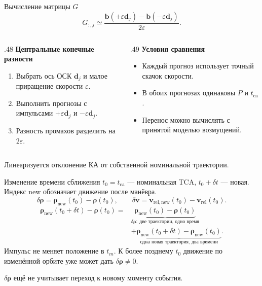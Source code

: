 \documentclass[11pt,aspectratio=169,t]{beamer}
\newcommand{\eqcompact}{\fontsize{10}{12}\selectfont}
\newcommand{\derivationmathspacing}{%
  \setlength{\abovedisplayskip}{2pt}%
  \setlength{\belowdisplayskip}{3pt}%
  \setlength{\abovedisplayshortskip}{2pt}%
  \setlength{\belowdisplayshortskip}{2pt}%
  \setlength{\jot}{2pt}}
\newcommand{\vect}[1]{\boldsymbol{#1}}
\begin{document}
\begin{frame}{Вычисление матрицы $G$}
\relax\derivationmathspacing
{\eqcompact\derivationmathspacing
\[
 \boxed{G_{:,j}\simeq
 \frac{\vect b(+\varepsilon\vect d_j)
       -\vect b(-\varepsilon\vect d_j)}{2\varepsilon}.}
\]
}
\begin{columns}[T,onlytextwidth]
\begin{column}{.48\textwidth}
\textbf{Центральные конечные разности}
\begin{enumerate}
\setlength{\itemsep}{3pt}
\item Выбрать ось ОСК $\vect d_j$ и малое приращение скорости $\varepsilon$.
\item Выполнить прогнозы с импульсами $+\varepsilon\vect d_j$ и $-\varepsilon\vect d_j$.
\item Разность промахов разделить на $2\varepsilon$.
\end{enumerate}
\end{column}
\begin{column}{.49\textwidth}
\textbf{Условия сравнения}
\begin{itemize}
\setlength{\itemsep}{3pt}
\item Каждый прогноз использует точный скачок скорости.
\item В обоих прогнозах одинаковы $P$ и $t_{\mathrm{ca}}$.
\item Перенос можно вычислять с принятой моделью возмущений.
\end{itemize}
\end{column}
\end{columns}
\smallskip
Линеаризуется отклонение КА от собственной номинальной траектории.
\end{frame}

\begin{frame}{Изменение времени сближения}
\relax\derivationmathspacing
$t_0=t_{\mathrm{ca}}$ --- номинальная TCA, $t_0+\delta t$ --- новая. Индекс $\mathrm{new}$ обозначает движение после манёвра.
{\eqcompact\derivationmathspacing
\[
 \delta\vect\rho=\vect\rho_{\mathrm{new}}(t_0)-\vect\rho(t_0),\qquad
 \delta\vect v=\vect v_{\mathrm{rel,new}}(t_0)-\vect v_{\mathrm{rel}}(t_0).
\]
\[
 \begin{aligned}
 \vect\rho_{\mathrm{new}}(t_0+\delta t)-\vect\rho(t_0)
 ={}&\underbrace{\vect\rho_{\mathrm{new}}(t_0)-\vect\rho(t_0)}
 _{\delta\vect\rho:\ \text{две траектории, одно время}}\\[4mm]
 &+\underbrace{\vect\rho_{\mathrm{new}}(t_0+\delta t)
              -\vect\rho_{\mathrm{new}}(t_0)}
 _{\text{одна новая траектория, два времени}}.
 \end{aligned}
\]
}
\smallskip
Импульс не меняет положение в $t_m$. К более позднему $t_0$ движение по изменённой орбите уже может дать $\delta\vect\rho\ne0$.
\par\smallskip
$\delta\vect\rho$ ещё не учитывает переход к новому моменту события.
\end{frame}
\end{document}
